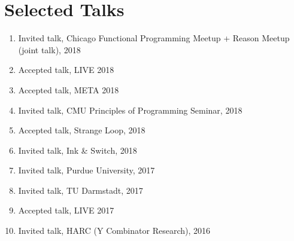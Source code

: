 \documentclass[10pt,letterpaper]{article}
\renewenvironment{itemize}{
  \begin{list}{}{
    \setlength{\leftmargin}{1.25em}
    \setlength{\itemsep}{0.25em}
    \setlength{\parskip}{0pt}
    \setlength{\parsep}{0.2em}
  }
}{
  \end{list}
}
\begin{document}
\section*{Selected Talks}
\begin{enumerate}
  \item Invited talk, Chicago Functional Programming Meetup + Reason Meetup (joint talk), 2018
  \item Accepted talk, LIVE 2018
  \item Accepted talk, META 2018
  \item Invited talk, CMU Principles of Programming Seminar, 2018
  \item Accepted talk, Strange Loop, 2018 
  \item Invited talk, Ink \& Switch, 2018
  \item Invited talk, Purdue University, 2017
  \item Invited talk, TU Darmstadt, 2017
  \item Accepted talk, LIVE 2017
  \item Invited talk, HARC (Y Combinator Research), 2016


\end{enumerate}
\end{document}
